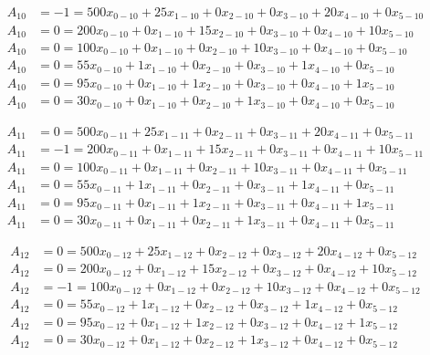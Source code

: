 \vspace{-\baselineskip}\begin{align*}
	A_{10} &= -1 = 500x_{0-10} + 25x_{1-10} + 0x_{2-10} + 0x_{3-10} + 20x_{4-10} + 0x_{5-10} \\ 
	A_{10} &= 0 = 200x_{0-10} + 0x_{1-10} + 15x_{2-10} + 0x_{3-10} + 0x_{4-10} + 10x_{5-10} \\ 
	A_{10} &= 0 = 100x_{0-10} + 0x_{1-10} + 0x_{2-10} + 10x_{3-10} + 0x_{4-10} + 0x_{5-10} \\ 
	A_{10} &= 0 = 55x_{0-10} + 1x_{1-10} + 0x_{2-10} + 0x_{3-10} + 1x_{4-10} + 0x_{5-10} \\ 
	A_{10} &= 0 = 95x_{0-10} + 0x_{1-10} + 1x_{2-10} + 0x_{3-10} + 0x_{4-10} + 1x_{5-10} \\ 
	A_{10} &= 0 = 30x_{0-10} + 0x_{1-10} + 0x_{2-10} + 1x_{3-10} + 0x_{4-10} + 0x_{5-10}
\end{align*}

\vspace{-\baselineskip}\begin{align*}
	A_{11} &= 0 = 500x_{0-11} + 25x_{1-11} + 0x_{2-11} + 0x_{3-11} + 20x_{4-11} + 0x_{5-11} \\ 
	A_{11} &= -1 = 200x_{0-11} + 0x_{1-11} + 15x_{2-11} + 0x_{3-11} + 0x_{4-11} + 10x_{5-11} \\ 
	A_{11} &= 0 = 100x_{0-11} + 0x_{1-11} + 0x_{2-11} + 10x_{3-11} + 0x_{4-11} + 0x_{5-11} \\ 
	A_{11} &= 0 = 55x_{0-11} + 1x_{1-11} + 0x_{2-11} + 0x_{3-11} + 1x_{4-11} + 0x_{5-11} \\ 
	A_{11} &= 0 = 95x_{0-11} + 0x_{1-11} + 1x_{2-11} + 0x_{3-11} + 0x_{4-11} + 1x_{5-11} \\ 
	A_{11} &= 0 = 30x_{0-11} + 0x_{1-11} + 0x_{2-11} + 1x_{3-11} + 0x_{4-11} + 0x_{5-11}
\end{align*}

\vspace{-\baselineskip}\begin{align*}
	A_{12} &= 0 = 500x_{0-12} + 25x_{1-12} + 0x_{2-12} + 0x_{3-12} + 20x_{4-12} + 0x_{5-12} \\ 
	A_{12} &= 0 = 200x_{0-12} + 0x_{1-12} + 15x_{2-12} + 0x_{3-12} + 0x_{4-12} + 10x_{5-12} \\ 
	A_{12} &= -1 = 100x_{0-12} + 0x_{1-12} + 0x_{2-12} + 10x_{3-12} + 0x_{4-12} + 0x_{5-12} \\ 
	A_{12} &= 0 = 55x_{0-12} + 1x_{1-12} + 0x_{2-12} + 0x_{3-12} + 1x_{4-12} + 0x_{5-12} \\ 
	A_{12} &= 0 = 95x_{0-12} + 0x_{1-12} + 1x_{2-12} + 0x_{3-12} + 0x_{4-12} + 1x_{5-12} \\ 
	A_{12} &= 0 = 30x_{0-12} + 0x_{1-12} + 0x_{2-12} + 1x_{3-12} + 0x_{4-12} + 0x_{5-12}
\end{align*}

